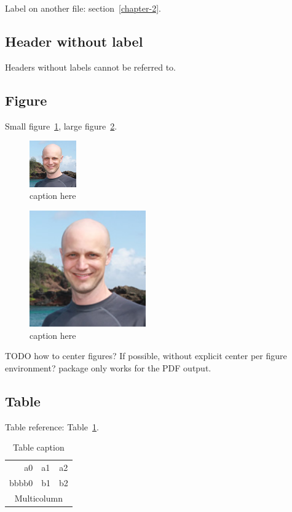       Label on another file: section~\ref{chapter-2}.

    \subsection{Header without label}

      Headers without labels cannot be referred to.

  \subsection{Figure}

    Small figure~\ref{fig-small}, large figure~\ref{fig-large}.

    \begin{figure}[htb]
      \includegraphics[width=2cm]{images/image.png}
      \caption{caption here}
      \label{fig-small}
    \end{figure}

    \begin{figure}[htb]
      \includegraphics[width=5cm]{images/image.png}
      \caption{caption here}
      \label{fig-large}
    \end{figure}

    TODO how to center figures? If possible, without explicit center per figure environment?
     package only works for the PDF output.

  \subsection{Table}

    Table reference: Table~\ref{table}.

    \begin{table}
      \caption{Table caption}
      \label{table}
      \begin{tabular}{|r|lc|}
          \hline
          a0    & a1 & a2 \\
          bbbb0 & b1 & b2 \\
          \hline
          \multicolumn{3}{|c|}{Multicolumn} \\
          \hline
        \end{tabular}
    \end{table}

